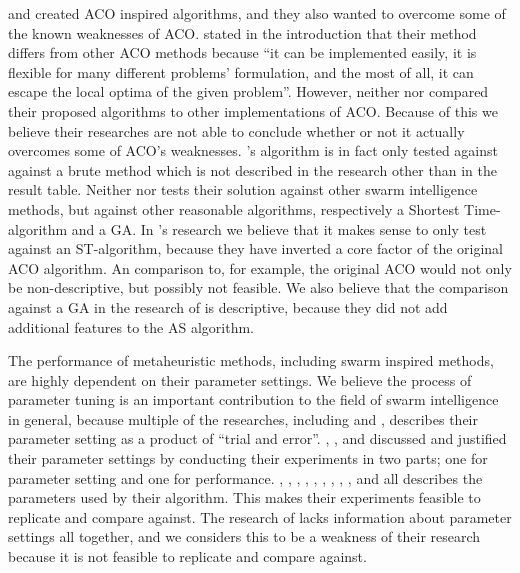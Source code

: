 \citet{hsiao04} and \citet{sedighpour14} created ACO inspired algorithms, and they also wanted to overcome some of the known weaknesses of ACO. \citet{hsiao04} stated in the introduction that their method differs from other ACO methods because ``it can be implemented easily, it is flexible for many different problems' formulation, and the most of all, it can escape the local optima of the given problem''. However, neither \citet{hsiao04} nor \citet{sedighpour14} compared their proposed algorithms to other implementations of ACO. Because of this we believe their researches are not able to conclude whether or not it actually overcomes some of ACO's weaknesses. \citet{hsiao04}'s algorithm is in fact only tested against against a brute method which is not described in the research other than in the result table. Neither \citet{dias14} nor \citet{poorzahedy11} tests their solution against other swarm intelligence methods, but against other reasonable algorithms, respectively a Shortest Time-algorithm and a GA. In \citet{dias14}'s research we believe that it makes sense to only test against an ST-algorithm, because they have inverted a core factor of the original ACO algorithm. An comparison to, for example, the original ACO would not only be non-descriptive, but possibly not feasible. We also believe that the comparison against a GA in the research of \citet{poorzahedy11} is descriptive, because they did not add additional features to the AS algorithm. \newline

The performance of metaheuristic methods, including swarm inspired methods, are highly dependent on their parameter settings. We believe the process of parameter tuning is an important contribution to the field of swarm intelligence in general, because multiple of the researches, including \citet{salehi-nezhad07} and \citet{yang07}, describes their parameter setting as a product of ``trial and error''. \citet{sedighpour14}, \citet{poorzahedy11}, and \citet{kechagiopoulos14} discussed and justified their parameter settings by conducting their experiments in two parts; one for parameter setting and one for performance. \citet{hsiao04}, \citet{salehi-nezhad07}, \citet{tripathi09}, \citet{sedighpour14}, \citet{yang07}, \citet{salehinejad10}, \citet{jiang10}, \citet{poorzahedy11}, \citet{nikolic14}, and \citet{kechagiopoulos14} all describes the parameters used by their algorithm. This makes their experiments feasible to replicate and compare against. The research of \citet{dias14} lacks information about parameter settings all together, and we considers this to be a weakness of their research because it is not feasible to replicate and compare against. \newline

